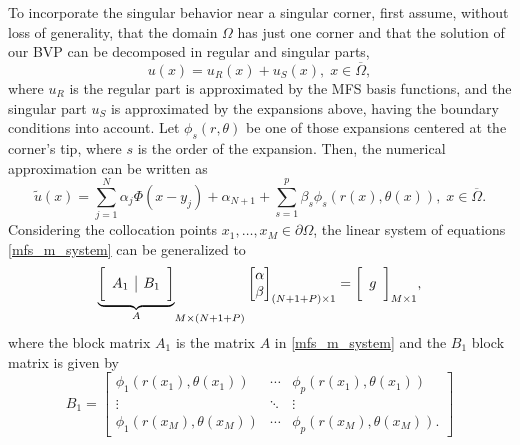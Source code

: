 To incorporate the singular behavior near a singular corner, first assume, without loss of generality, that the domain \(\Omega\) has just one corner and that the solution of our BVP can be decomposed in regular and singular parts,
\[
    u(x) = u_R(x) + u_S(x), \; x \in \overline{\Omega},
\]
where \(u_R\) is the regular part is approximated by the MFS basis functions, and the singular part \(u_S\) is approximated by the expansions above, having the boundary conditions into account. Let \(\phi_s(r, \theta)\) be one of those expansions centered at the corner's tip, where \(s\) is the order of the expansion. Then, the numerical approximation can be written as
\begin{equation}
    \tilde{u}(x) = \sum_{j=1}^{N}\alpha_j \Phi(x-y_j) + \alpha_{N+1} + \sum_{s=1}^{p} \beta_s \phi_s(r(x),\theta(x)), \; x \in \overline{\Omega}.
\end{equation}
Considering the collocation points \(x_1,\dots,x_M \in \partial \Omega\), the linear system of equations \eqref{mfs_m_system} can be generalized to
\begin{equation}
    {\underbrace{\bigg[ \begin{array}{c | c}
        A_1 & B_1 \\
    \end{array} \bigg]}_{A}}_{M\times(N+1+P)}
    \begin{bmatrix}
        \alpha\\
        \beta
    \end{bmatrix}_{(N+1+P)\times 1}
    =
    \bigg[ \begin{array}{c}
        g \\
    \end{array} \bigg]_{M\times 1},
\end{equation}
where the block matrix \(A_1\) is the matrix \(A\) in \eqref{mfs_m_system} and the \(B_1\) block matrix is given by
\[
    B_1=\begin{bmatrix}
        \phi_1(r(x_1), \theta(x_1)) & \cdots & \phi_p(r(x_1), \theta(x_1)) \\
        \vdots & \ddots & \vdots\\
        \phi_1(r(x_M), \theta(x_M)) & \cdots & \phi_p(r(x_M), \theta(x_M)).
    \end{bmatrix}
\]


